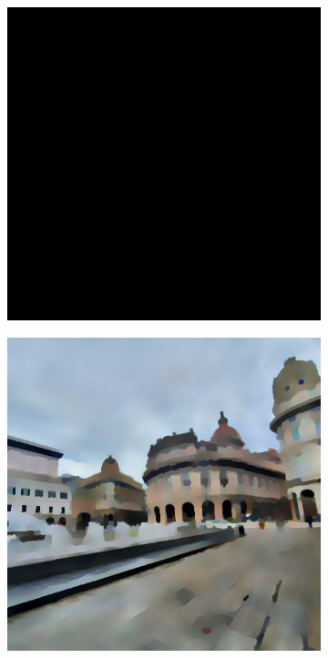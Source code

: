 \begin{figure}
	\begin{minipage}{\textwidth}%
		\begin{subfigure}{.3\textwidth}%
			\includegraphics[width=\textwidth]{atelier/breg_cat/cat-0.png}
		\end{subfigure}\hfill%
		\begin{subfigure}{.3\textwidth}%
			\includegraphics[width=\textwidth]{atelier/breg_cat/cat-10.png}

\end{subfigure}
\end{minipage}
\end{figure}
